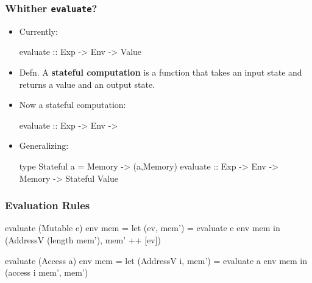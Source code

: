 \documentclass[xcolor=pdftex,dvipsnames,table]{beamer}
\begin{document}
\begin{frame}[fragile]
\frametitle{Whither {\texttt{evaluate}}?}

\begin{itemize}
\item Currently:
\begin{hcode}
    evaluate :: Exp -> Env -> Value
\end{hcode}

\pause
\item Defn. A {\bf stateful computation} is a function that takes an input state and returns a value and an output state.


\pause
\item Now a stateful computation:
\begin{hcode}
    evaluate :: Exp -> Env -> %
\end{hcode}


\pause
\item Generalizing:
\begin{hcode}
    type Stateful a = Memory -> (a,Memory)
    evaluate :: Exp -> Env -> Memory -> Stateful Value
\end{hcode}


\end{itemize}

\end{frame}

\begin{frame}[fragile]
\frametitle{Evaluation Rules}

\begin{hcode}
evaluate (Mutable e) env mem = 
   let
      (ev, mem') = evaluate e env mem
   in 
      (AddressV (length mem'), mem' ++ [ev])
\end{hcode}

\pause

\begin{hcode}
evaluate (Access a) env mem =
  let 
     (AddressV i, mem') = evaluate a env mem 
  in
     (access i mem', mem')
\end{hcode}


\end{frame}
\end{document}
